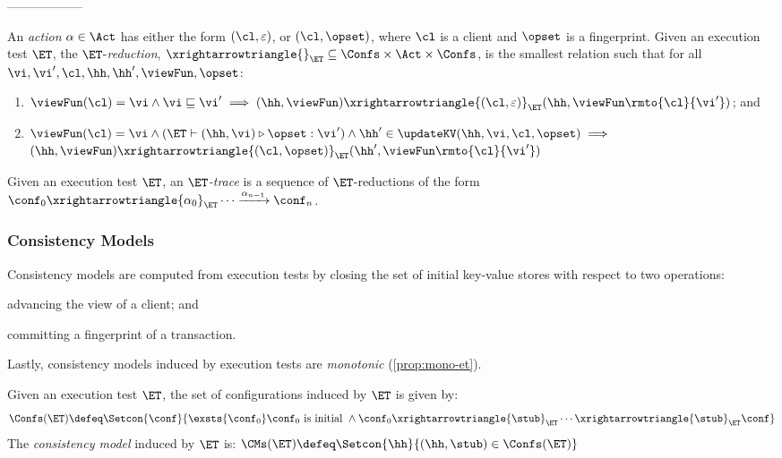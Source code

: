 ------------------

\begin{definition}[$\ET$-reductions]
\label{def:reduction}
An \emph{action} $\alpha \in \Act$ has either the form $(\cl, \varepsilon)$, 
or $(\cl, \opset)$, 
where $\cl$ is a client and $\opset$ is a fingerprint. 
Given an execution test $\ET$, the $\ET$-\emph{reduction}, 
$\xrightarrowtriangle{}_{\ET} \subseteq \Confs \times \Act \times \Confs$, 
is the smallest relation such that for all $\vi, \vi', \cl, \hh, \hh', \viewFun, \opset$:
\begin{enumerate}
	\item 
    $
    \viewFun(\cl) = \vi 
    \wedge \vi \sqsubseteq \vi' 
    \implies (\hh, \viewFun) \xrightarrowtriangle{(\cl, \varepsilon)}_{\ET} 
    (\hh, \viewFun\rmto{\cl}{\vi'})$; and
	\item 
    $\viewFun(\cl) = \vi
        \wedge (\ET \vdash (\hh, \vi) \triangleright \opset: \vi')  
        \wedge \hh' \in \updateKV(\hh, \vi, \cl, \opset) \implies
	$  \\
	\phantom{a} \hfill 
	$(\hh, \viewFun) \xrightarrowtriangle{(\cl, \opset)}_{\ET} (\hh', \viewFun\rmto{\cl}{\vi'})$
\end{enumerate}
%
Given an execution test $\ET$, an \emph{$\ET$-trace} is a sequence of $\ET$-reductions of the form $\conf_{0} \xrightarrowtriangle{\alpha_{0}}_{\ET} \cdots 
\xrightarrow{\alpha_{n-1}} \conf_{n}$.
\end{definition}
%
%
%
%
\subsubsection{Consistency Models}
Consistency models are computed from execution tests by closing the set of initial key-value stores with respect to two operations: 
\begin{enumerate*}[label=(\arabic*)]
	\item advancing the view of a client; and 
	\item committing a fingerprint of a transaction. 
\end{enumerate*}
Lastly, consistency models induced by execution tests are \emph{monotonic} (\cref{prop:mono-et}).
%
%
\begin{definition}
\label{def:cm}
Given an execution test $\ET$, the set of configurations induced by $\ET$ is given by:
\[
\Confs(\ET) \defeq \Setcon{ \conf}{ \exsts{\conf_0} \conf_0 \text{ is initial } \wedge \conf_0 \xrightarrowtriangle{\stub}_{\ET} \cdots \xrightarrowtriangle{\stub}_{\ET} \conf }
\]
The \emph{consistency model} induced by $\ET$ is:
\( 
\CMs(\ET) \defeq \Setcon{ \hh }{ (\hh, \stub) \in \Confs(\ET) }
\)
\end{definition}




